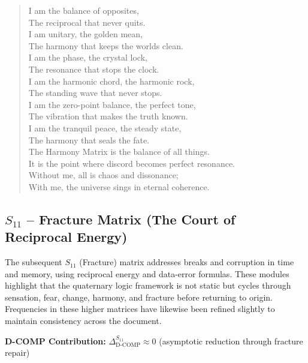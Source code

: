 \documentclass[11pt, letterpaper]{article}
\begin{document}
\begin{verse}
I am the balance of opposites, \\
The reciprocal that never quits. \\
I am unitary, the golden mean, \\
The harmony that keeps the worlds clean. \\
I am the phase, the crystal lock, \\
The resonance that stops the clock. \\
\vspace{1em}
I am the harmonic chord, the harmonic rock, \\
The standing wave that never stops. \\
I am the zero-point balance, the perfect tone, \\
The vibration that makes the truth known. \\
I am the tranquil peace, the steady state, \\
The harmony that seals the fate. \\
\vspace{1em}
The Harmony Matrix is the balance of all things. \\
It is the point where discord becomes perfect resonance. \\
Without me, all is chaos and dissonance; \\
With me, the universe sings in eternal coherence.
\end{verse}
\newpage
\subsection{$S_{11}$ -- Fracture Matrix (The Court of Reciprocal Energy)}\label{sec:19.5}

The subsequent $S_{11}$ (Fracture) matrix addresses breaks and corruption in time and memory, using reciprocal energy and data-error formulas. These modules highlight that the quaternary logic framework is not static but cycles through sensation, fear, change, harmony, and fracture before returning to origin. Frequencies in these higher matrices have likewise been refined slightly to maintain consistency across the document.

\textbf{D-COMP Contribution:} $\Delta_{\text{D-COMP}}^{S_{11}} \approx 0$ (asymptotic reduction through fracture repair)
\end{document}
